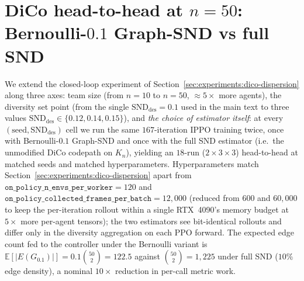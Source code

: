 \documentclass{article}
\theoremstyle{plain}
\theoremstyle{definition}
\theoremstyle{remark}
\newcommand{\SND}{\ensuremath{\mathrm{SND}}}
\begin{document}
\section{DiCo head-to-head at $n{=}50$: Bernoulli-$0.1$ Graph-SND vs full SND}
\label{app:dico-n50-sweep}

We extend the closed-loop experiment of
Section~\ref{sec:experiments:dico-dispersion} along three axes: team
size (from $n{=}10$ to $n{=}50$, ${\approx}5\times$ more agents), the
diversity set point (from the single $\SND_{\mathrm{des}}{=}0.1$ used
in the main text to three values
$\SND_{\mathrm{des}}\in\{0.12,0.14,0.15\}$), and \emph{the choice of
estimator itself}: at every $(\mathrm{seed},\SND_{\mathrm{des}})$
cell we run the same $167$-iteration IPPO training twice, once with
Bernoulli-$0.1$ Graph-SND and once with the full SND estimator
(i.e.\ the unmodified DiCo codepath on $K_n$), yielding an
$18$-run ($2{\times}3{\times}3$) head-to-head at matched seeds and
matched hyperparameters. Hyperparameters match
Section~\ref{sec:experiments:dico-dispersion} apart from
$\texttt{on\_policy\_n\_envs\_per\_worker}{=}120$ and
$\texttt{on\_policy\_collected\_frames\_per\_batch}{=}12{,}000$
(reduced from $600$ and $60{,}000$ to keep the per-iteration rollout
within a single RTX~4090's memory budget at $5{\times}$ more
per-agent tensors); the two estimators see bit-identical rollouts
and differ only in the diversity aggregation on each PPO forward.
The expected edge count fed to the controller under the Bernoulli
variant is $\mathbb{E}[|E(G_{0.1})|]{=}0.1\binom{50}{2}{=}122.5$
against $\binom{50}{2}{=}1{,}225$ under full SND ($10\%$ edge
density), a nominal $10\times$ reduction in per-call metric work.
\end{document}
